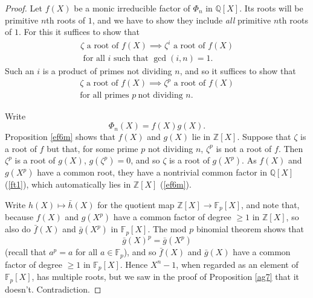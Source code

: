 \documentclass[a4paper,11pt,final,openany]{memoir}
\theoremstyle{nonumberplain}
\newtheorem{proof}{Proof.}
\begin{document}
\begin{proof}
Let $f(X)$ be a monic irreducible factor of $\Phi_{n}$ in $\mathbb{Q}[X]$. Its
roots will be primitive $n$th roots of $1$, and we have to show they include
\textit{all} primitive $n$th roots of $1$. For this it suffices to show that
\begin{align*}
\zeta\text{\ a root of }f(X)\implies\zeta^{i}\text{\ a root of }%
f(X)\\
\text{\ for all }i\text{\ such that }\gcd(i,n)=1.
\end{align*}
Such an $i$ is a product of primes not dividing $n$, and so it suffices to
show that
\begin{align*}
\zeta\text{\ a root of }f(X)\implies\zeta^{p}\text{\ a root of $f(X)$
}\\
\text{for all
primes }p\ \text{not dividing }n.
\end{align*}


Write
\[
\Phi_{n}(X)=f(X)g(X)\text{.}%
\]
Proposition \ref{ef6m} shows that $f(X)$ and $g(X)$ lie in $\mathbb{Z}[X]$.
Suppose that $\zeta$ is a root of $f$ but that, for some prime $p$ not
dividing $n$, $\zeta^{p}$ is not a root of $f$. Then $\zeta^{p}$ is a root of
$g(X)$, $g(\zeta^{p})=0$, and so $\zeta$ is a root of $g(X^{p})$. As $f(X)$
and $g(X^{p})$ have a common root, they have a nontrivial common factor in
$\mathbb{Q}{}[X]$ (\ref{ft1}), which automatically lies in $\mathbb{Z}{}[X]$
(\ref{ef6m}).

Write $h(X)\mapsto\bar{h}(X)$ for the quotient map $\mathbb{Z}[X]\rightarrow
\mathbb{F}_{p}[X]$, and note that, because $f(X)$ and $g(X^{p})$ have a common
factor of degree $\geq1$ in $\mathbb{Z}{}[X]$, so also do $\bar{f}(X)$ and
$\bar{g}(X^{p})$ in $\mathbb{F}{}_{p}[X]$. The mod $p$ binomial theorem shows
that
\[
\bar{g}(X)^{p}=\bar{g}(X^{p})
\]
(recall that $a^{p}=a$ for all $a\in\mathbb{F}{}_{p}$), and so $\bar{f}(X)$
and $\bar{g}(X)$ have a common factor of degree $\geq1$ in $\mathbb{F}{}%
_{p}[X]$. Hence $X^{n}-1$, when regarded as an element of $\mathbb{F}_{p}[X]$,
has multiple roots, but we saw in the proof of Proposition \ref{ag7} that it
doesn't. Contradiction.
\end{proof}
\end{document}
